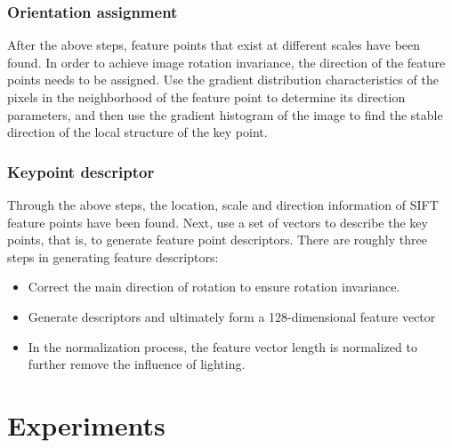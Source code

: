 \documentclass[conference]{IEEEtran}
\begin{document}
\subsubsection{Orientation assignment}
After the above steps, feature points that exist at different scales have been found. In order to achieve image rotation invariance, the direction of the feature points needs to be assigned. Use the gradient distribution characteristics of the pixels in the neighborhood of the feature point to determine its direction parameters, and then use the gradient histogram of the image to find the stable direction of the local structure of the key point.
\subsubsection{Keypoint descriptor}
Through the above steps, the location, scale and direction information of SIFT feature points have been found. Next, use a set of vectors to describe the key points, that is, to generate feature point descriptors. There are roughly three steps in generating feature descriptors:
\begin{itemize}
\item Correct the main direction of rotation to ensure rotation invariance.
\item Generate descriptors and ultimately form a 128-dimensional feature vector
\item In the normalization process, the feature vector length is normalized to further remove the influence of lighting.
\end{itemize}
\section{Experiments}
\end{document}
